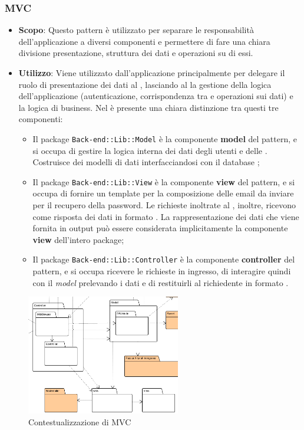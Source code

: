 \subsubsection{MVC}

\begin{itemize}

	\item \textbf{Scopo}: Questo pattern è utilizzato per separare le responsabilità dell'applicazione a diversi componenti e permettere di fare una chiara divisione presentazione, struttura dei dati e operazioni su di essi.
	\item \textbf{Utilizzo}: Viene utilizzato dall'applicazione principalmente per delegare il ruolo di presentazione dei dati al , lasciando al  la gestione della logica dell'applicazione (autenticazione, corrispondenza tra  e operazioni sui dati) e la logica di business. Nel  è presente una chiara distinzione tra questi tre componenti:
	\begin{itemize}
		\item Il package \texttt{Back-end::Lib::Model} è la componente \textbf{model} del pattern, e si occupa di gestire la logica interna dei dati degli utenti e delle . Costruisce dei modelli di dati interfacciandosi con il database ;
		\item Il package \texttt{Back-end::Lib::View} è la componente \textbf{view} del pattern, e si occupa di fornire un template per la composizione delle email da inviare per il recupero della password. Le richieste inoltrate al , inoltre, ricevono come risposta dei dati in formato . La rappresentazione dei dati che viene fornita in output può essere considerata implicitamente la componente \textbf{view} dell'intero package;
		\item Il package \texttt{Back-end::Lib::Controller} è la componente \textbf{controller} del pattern, e si occupa ricevere le richieste in ingresso, di interagire quindi con il \textit{model} prelevando i dati e di restituirli al richiedente in formato .
	\end{itemize}
	
\end{itemize}

\begin{figure}[H]
\centering \includegraphics[width=0.6\textwidth]{patterns/contestualizzazione/mvc.png}
\caption{Contestualizzazione di MVC}
\label{fig:mvc}
\end{figure}

